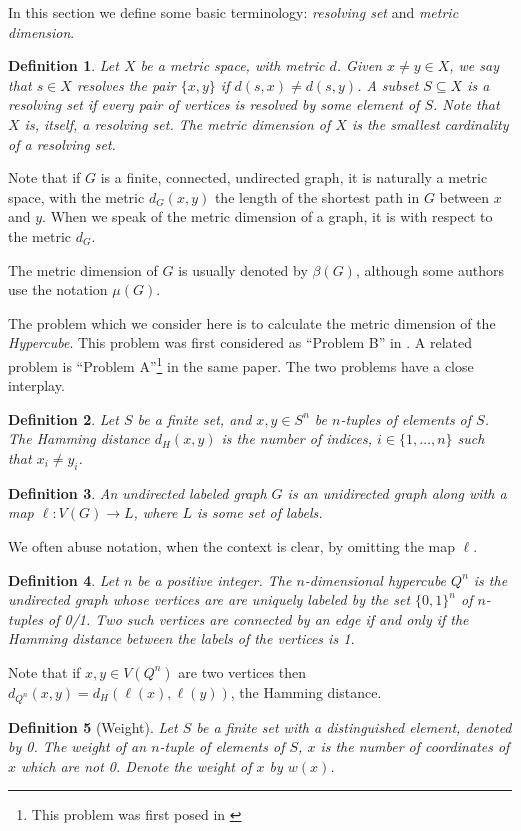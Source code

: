 \documentclass{article}
\newtheorem{definition}{Definition}
\begin{document}
In this section we define some basic terminology: \emph{resolving set}
and \emph{metric dimension}.

\begin{definition}
  Let $X$ be a metric space, with metric $d$.  Given $x \ne y \in X$,
  we say that $s \in X$ \emph{resolves} the pair $\{x,y\}$ if $d(s,x)
  \ne d(s,y)$.  A subset $S \subseteq X$ is a \emph{resolving set} if
  every pair of vertices is resolved by some element of $S$.  Note
  that $X$ is, itself, a resolving set.  The \emph{metric dimension}
  of $X$ is the smallest cardinality of a resolving set.
\end{definition}

Note that if $G$ is a finite, connected, undirected graph, it is
naturally a metric space, with the metric $d_G(x,y)$ the length of the
shortest path in $G$ between $x$ and $y$.  When we speak of the metric
dimension of a graph, it is with respect to the metric $d_G$.

The metric dimension of $G$ is usually denoted by $\beta(G)$, although
some authors use the notation $\mu(G)$.

The problem which we consider here is to calculate the metric
dimension of the \emph{Hypercube}.  This problem was first considered
as ``Problem B'' in \cite{erdos1963two}.  A related problem is
``Problem A''\footnote{This problem was first posed in \cite{shapiro1963combinatory}} in the same paper.  The two problems have a close
interplay.

\begin{definition}
  Let $S$ be a finite set, and $x,y \in S^n$ be $n$-tuples of elements
  of $S$.  The \emph{Hamming distance} $d_H(x,y)$ is the number of
  indices, $i \in \{1, \dots, n\}$ such that $x_i \ne y_i$.
\end{definition}

\begin{definition}
  An undirected \emph{labeled graph} $G$ is an unidirected graph along
  with a map $\ell: V(G) \rightarrow L$, where $L$ is some set of
  labels.
\end{definition}
We often abuse notation, when the context is clear, by omitting the
map $\ell$.
\begin{definition}
  Let $n$ be a positive integer. The $n$-dimensional \emph{hypercube}
  $Q^n$ is the undirected graph whose vertices are are uniquely
  labeled by the set $\{0,1\}^n$ of $n$-tuples of 0/1.  Two such
  vertices are connected by an edge if and only if the Hamming
  distance between the labels of the vertices is 1.
\end{definition}
Note that if $x,y \in V(Q^n)$ are two vertices then $d_{Q^n}(x,y) =
d_H(\ell(x),\ell(y))$, the Hamming distance.
\begin{definition}[Weight]
  Let $S$ be a finite set with a distinguished element, denoted by 0.
  The \emph{weight} of an $n$-tuple of elements of $S$, $x$ is the number
  of coordinates of $x$ which are not 0.  Denote the weight of $x$ by $w(x)$.
\end{definition}
\end{document}
